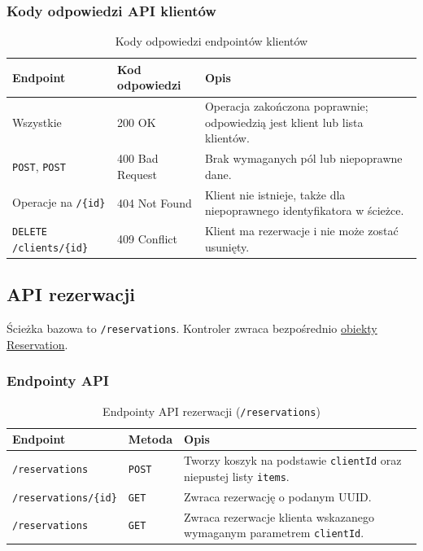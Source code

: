 \subsubsection{Kody odpowiedzi API klientów}

\begin{table}[H]
  \centering
  \renewcommand{\arraystretch}{1.3}
  \begin{tabularx}{\textwidth}{|l|l|X|}
    \hline
    \textbf{Endpoint} & \textbf{Kod odpowiedzi} & \textbf{Opis} \\
    \hline
    Wszystkie & 200 OK & Operacja zakończona poprawnie; odpowiedzią jest klient lub lista klientów. \\
    \hline
    \texttt{POST}, \texttt{POST} & 400 Bad Request & Brak wymaganych pól lub niepoprawne dane. \\
    \hline
    Operacje na \texttt{/\{id\}} & 404 Not Found & Klient nie istnieje, także dla niepoprawnego identyfikatora w ścieżce. \\
    \hline
    \texttt{DELETE /clients/\{id\}} & 409 Conflict & Klient ma rezerwacje i nie może zostać usunięty. \\
    \hline
  \end{tabularx}
  \caption{Kody odpowiedzi endpointów klientów}
  \label{tab:client-response-codes}
\end{table}

\subsection{API rezerwacji}

Ścieżka bazowa to \texttt{/reservations}. Kontroler zwraca bezpośrednio
\hyperref[schema:reservation]{obiekty Reservation}.

\subsubsection{Endpointy API}

\begin{table}[H]
  \centering
  \renewcommand{\arraystretch}{1.3}
  \begin{tabularx}{\textwidth}{|l|l|X|}
    \hline
    \textbf{Endpoint} & \textbf{Metoda} & \textbf{Opis} \\
    \hline
    \texttt{/reservations} & \texttt{POST} & Tworzy koszyk na podstawie \texttt{clientId} oraz niepustej listy \texttt{items}. \\
    \hline
    \texttt{/reservations/\{id\}} & \texttt{GET} & Zwraca rezerwację o podanym UUID. \\
    \hline
    \texttt{/reservations} & \texttt{GET} & Zwraca rezerwacje klienta wskazanego wymaganym parametrem \texttt{clientId}. \\
    \hline
  \end{tabularx}
  \caption{Endpointy API rezerwacji (\texttt{/reservations})}
  \label{tab:reservation-endpoints}
\end{table}

